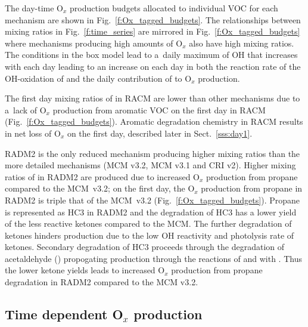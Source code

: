 \documentclass[acpd, online, hvmath]{copernicus}
\begin{document}
The day-time O$_{x}$ production budgets allocated to individual VOC for each
mechanism are shown in Fig.~\ref{f:Ox_tagged_budgets}.  The
relationships between  mixing ratios in
Fig.~\ref{f:time_series} are mirrored in
Fig.~\ref{f:Ox_tagged_budgets} where mechanisms producing high amounts
of O$_{x}$ also have high  mixing ratios.  The conditions
in the box model lead to a~daily maximum of OH that increases with
each day leading to an increase on each day in both the reaction rate
of the OH-oxidation of  and the daily contribution of
 to O$_{x}$ production.

The first day mixing ratios of  in RACM are lower than other
mechanisms due to a~lack of O$_{x}$ production from aromatic VOC on
the first day in RACM (Fig.~\ref{f:Ox_tagged_budgets}).  Aromatic
degradation chemistry in RACM results in net loss of O$_{x}$ on the
first day, described later in Sect.~\ref{sss:day1}.

RADM2 is the only reduced mechanism producing higher  mixing
ratios than the more detailed mechanisms (MCM v3.2, MCM v3.1 and CRI
v2).  Higher mixing ratios of  in RADM2 are produced due to
increased O$_{x}$ production from propane compared to the MCM~v3.2;
on the first day, the O$_{x}$ production from propane in RADM2 is
triple that of the MCM~v3.2 (Fig.~\ref{f:Ox_tagged_budgets}).  Propane
is represented as HC3 in RADM2 \citep{Stockwell:1990} and the degradation
of HC3 has a lower yield of the less reactive ketones compared
to the MCM. The further degradation of ketones hinders  production
due to the low OH reactivity and photolysis rate of ketones. Secondary degradation
of HC3 proceeds through the degradation of acetaldehyde () 
propogating  production through the reactions of  and
 with . Thus the lower ketone yields leads to increased
O$_{x}$ production from propane degradation in RADM2 compared to
the MCM v3.2.


\subsection{Time dependent O$_{x}$ production}
\end{document}

